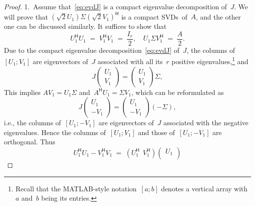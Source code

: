 \documentclass[11pt,a4paper]{article}  %
\numberwithin{equation}{section}
\theoremstyle{definition}
\newcommand{\hmt}{{\scriptscriptstyle{{\mathsf{H}}}}}
\newcommand{\ie}{{i.e.}}
\begin{document}
\begin{proof} 1.~Assume that~\eqref{eq:evdJ} is a compact eigenvalue decomposition of~$J$.
  We will prove that $(\sqrt{2} U_1)\Sigma (\sqrt{2} V_1)^\hmt$ is a
  compact SVDs~of~$A$, and the other one can be discussed similarly.
  It suffices to show that
  \begin{equation}
    \label{eq:svdA}
    U_1^\hmt U_1 \;=\; V_1^\hmt V_1 \;=\; \dfrac{I_r}{2},
    \quad U_1\Sigma V_1^\hmt \;=\; \dfrac{A}{2}.
  \end{equation}
  Due to the compact eigenvalue decomposition~\eqref{eq:evdJ} of~$J$,
  the columns of~$[U_1; V_1]$ are eigenvectors of~$J$ associated with
  all its~$r$ positive eigenvalues,\footnote{
   Recall that the MATLAB-style notation~$[a; b]$ denotes a vertical
   array with~$a$ and~$b$ being its entries.
  }
  and
  \begin{equation}
    \label{eq:evd1}
    J
    \begin{pmatrix}
      U_1 \\
      V_1
    \end{pmatrix}
    =
    \begin{pmatrix}
      U_1 \\
      V_1
    \end{pmatrix}
    \Sigma,
  \end{equation}
   This implies $AV_1 = U_1\Sigma$ and~$A^\hmt U_1 = \Sigma V_1$, which can be reformulated as
  \begin{equation}
    \label{eq:evd2}
    J
    \begin{pmatrix}
      U_1 \\
      -V_1
    \end{pmatrix}
    =
    \begin{pmatrix}
      U_1 \\
      -V_1
    \end{pmatrix}
    (-\Sigma),
  \end{equation}
  \ie, the columns of~$[U_1; -V_1]$ are eigenvectors of~$J$ associated with the negative eigenvalues.
  Hence the columns of~$[U_1; V_1]$ and those of~$[U_1; -V_1]$ are orthogonal. Thus
  \begin{equation*}
    U_1^\hmt U_1 -V_1^\hmt V_1 \;=\;
    (U_1^\hmt \;\, V_1^\hmt)
    \begin{pmatrix}
      U_1\\

\end{pmatrix}
\end{equation*}
\end{proof}
\end{document}
